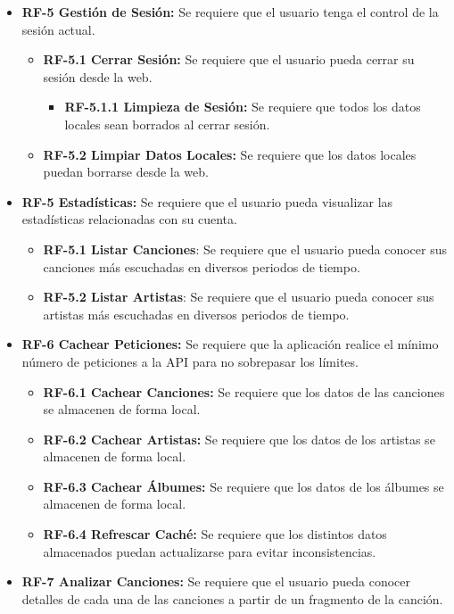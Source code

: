 \begin{itemize}
    \item
        \textbf{RF-5 Gestión de Sesión:} Se requiere que el usuario tenga el control de la sesión actual.
        \begin{itemize}
            \item
                \textbf{RF-5.1 Cerrar Sesión:} Se requiere que el usuario pueda cerrar su sesión desde la web.
                \begin{itemize}
                    \item
                    \textbf{RF-5.1.1 Limpieza de Sesión:} Se requiere que todos los datos locales sean borrados al cerrar sesión.
                \end{itemize}
            \item
                \textbf{RF-5.2 Limpiar Datos Locales:} Se requiere que los datos locales puedan borrarse desde la web.
        \end{itemize}
    
    \item
        \textbf{RF-5 Estadísticas:} Se requiere que el usuario pueda visualizar las estadísticas relacionadas con su cuenta.
        \begin{itemize}
            \item \textbf{RF-5.1 Listar Canciones}: Se requiere que el usuario pueda conocer sus canciones más escuchadas en diversos periodos de tiempo.
            \item \textbf{RF-5.2 Listar Artistas}: Se requiere que el usuario pueda conocer sus artistas más escuchadas en diversos periodos de tiempo.
        \end{itemize}
    
    \item
        \textbf{RF-6 Cachear Peticiones:} Se requiere que la aplicación realice el mínimo número de peticiones a la API para no sobrepasar los límites.
            \begin{itemize}
                \item \textbf{RF-6.1 Cachear Canciones:} Se requiere que los datos de las canciones se almacenen de forma local.
                \item \textbf{RF-6.2 Cachear Artistas:} Se requiere que los datos de los artistas se almacenen de forma local.
                \item \textbf{RF-6.3 Cachear Álbumes:} Se requiere que los datos de los álbumes se almacenen de forma local.
                \item \textbf{RF-6.4 Refrescar Caché:} Se requiere que los distintos datos almacenados puedan actualizarse para evitar inconsistencias.
            \end{itemize}
    \item
        \textbf{RF-7 Analizar Canciones:} Se requiere que el usuario pueda conocer detalles de cada una de las canciones a partir de un fragmento de la canción.
\end{itemize}

